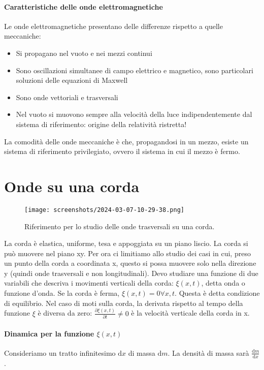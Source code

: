 \paragraph{Caratteristiche delle onde elettromagnetiche}
Le onde elettromagnetiche presentano delle differenze rispetto a quelle meccaniche:
\begin{itemize}
	
	\item Si propagano nel vuoto e nei mezzi continui
	\item Sono oscillazioni simultanee di campo elettrico e magnetico, sono particolari soluzioni delle equazioni di Maxwell
	\item Sono onde vettoriali e trasversali
	\item Nel vuoto si muovono sempre alla velocità della luce indipendentemente dal sistema di riferimento: origine della relatività ristretta!
\end{itemize}

La comodità delle onde meccaniche è che, propagandosi in un mezzo, esiste un sistema di riferimento privilegiato, ovvero il sistema in cui il mezzo è fermo.

\section{Onde su una corda}

\begin{figure}[H]
	\centering
	\texttt{[image: screenshots/2024-03-07-10-29-38.png]}
	\caption{Riferimento per lo studio delle onde trasversali su una corda.}
\end{figure}

La corda è elastica, uniforme, tesa e appoggiata su un piano liscio. La corda si può muovere nel piano xy. Per ora ci limitiamo allo studio dei casi in cui, preso un punto della corda a coordinata x, questo si possa muovere solo nella direzione y (quindi onde trasversali e non longitudinali). Devo studiare una funzione di due variabili che descriva i movimenti verticali della corda: \(\xi (x,t)\), detta onda o funzione d'onda. Se la corda è ferma, \(\xi (x,t) = 0 \forall x,t\). Questa è detta condizione di equilibrio. Nel caso di moti sulla corda, la derivata rispetto al tempo della funzione \(\xi \) è diversa da zero: \(\frac{\partial \xi (x,t)}{\partial t} \neq 0\) è la velocità verticale della corda in x.

\paragraph{Dinamica per la funzione \(\xi (x,t)\) } Consideriamo un tratto infinitesimo \(\mathrm{d} x \) di massa \(\mathrm{d} m \). La densità di massa sarà \(\frac{\mathrm{d}m}{\mathrm{d}x} 	\).

